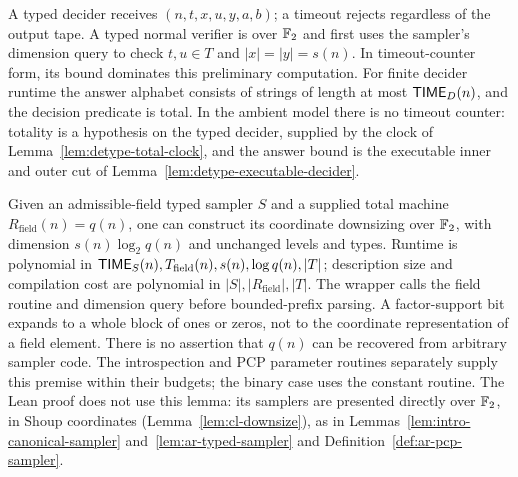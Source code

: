 \begin{definition}
\label{def:typed-normal-interface}
\leanok
A typed decider receives $(n,t,x,u,y,a,b)$; a timeout rejects regardless of
the output tape. A typed normal verifier is over $\mathbb{F}_2$ and first uses the
sampler's dimension query to check $t,u\in T$ and $|x|=|y|=s(n)$.
In timeout-counter form, its bound dominates this preliminary computation.
For finite decider runtime the answer alphabet consists of strings of length
at most $\mathsf{TIME}_D(n)$, and the decision predicate is total.
In the ambient model there is no timeout counter: totality is a hypothesis on the typed
decider, supplied by the clock of Lemma~\ref{lem:detype-total-clock}, and the answer bound
is the executable inner and outer cut of Lemma~\ref{lem:detype-executable-decider}.
\end{definition}

\begin{lemma}
\label{lem:typed-downsize}
Given an admissible-field typed sampler $S$ and a supplied total machine
$R_{\mathrm{field}}(n)=q(n)$, one can construct its coordinate downsizing
over $\mathbb{F}_2$, with dimension $s(n)\log_2q(n)$ and unchanged levels and types.
Runtime is polynomial in $\mathsf{TIME}_S(n),T_{\mathrm{field}}(n),s(n),\log q(n),|T|$;
description size and compilation cost are polynomial in
$|S|,|R_{\mathrm{field}}|,|T|$.
The wrapper calls the field routine and dimension query before bounded-prefix
parsing. A factor-support bit expands to a whole block of ones or zeros,
not to the coordinate representation of a field element.
There is no assertion that $q(n)$ can be recovered from arbitrary sampler
code. The introspection and PCP parameter routines separately supply this
premise within their budgets; the binary case uses the constant routine.
The Lean proof does not use this lemma: its samplers are presented directly over $\mathbb{F}_2$, in
Shoup coordinates (Lemma~\ref{lem:cl-downsize}), as in
Lemmas~\ref{lem:intro-canonical-sampler} and~\ref{lem:ar-typed-sampler} and
Definition~\ref{def:ar-pcp-sampler}.
\end{lemma}

